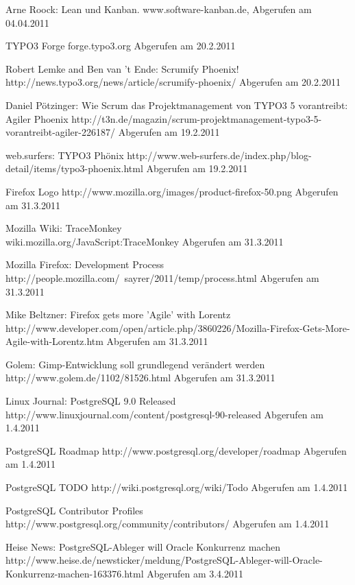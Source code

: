 \documentclass[german,english]{header}
\begin{document}
\begin{thebibliography}{5}
Arne Roock: 
Lean und Kanban.
www.software-kanban.de, Abgerufen am 04.04.2011

TYPO3 Forge
forge.typo3.org Abgerufen am 20.2.2011

Robert Lemke and Ben van 't Ende:
Scrumify Phoenix!
http://news.typo3.org/news/article/scrumify-phoenix/ Abgerufen am 20.2.2011

Daniel Pötzinger:
Wie Scrum das Projektmanagement von TYPO3 5 vorantreibt: Agiler Phoenix
http://t3n.de/magazin/scrum-projektmanagement-typo3-5-vorantreibt-agiler-226187/ Abgerufen am 19.2.2011

web.surfers:
TYPO3 Phönix
http://www.web-surfers.de/index.php/blog-detail/items/typo3-phoenix.html Abgerufen am 19.2.2011

Firefox Logo
http://www.mozilla.org/images/product-firefox-50.png Abgerufen am 31.3.2011


Mozilla Wiki:
TraceMonkey
\\wiki.mozilla.org/JavaScript:TraceMonkey Abgerufen am 31.3.2011

Mozilla Firefox: Development Process
http://people.mozilla.com/~sayrer/2011/temp/process.html Abgerufen am 31.3.2011

Mike Beltzner:
Firefox gets more 'Agile' with Lorentz
\\http://www.developer.com/open/article.php/3860226/Mozilla-Firefox-Gets-More-Agile-with-Lorentz.htm Abgerufen am 31.3.2011

Golem: Gimp-Entwicklung soll grundlegend verändert werden
http://www.golem.de/1102/81526.html Abgerufen am 31.3.2011

Linux Journal:
PostgreSQL 9.0 Released
http://www.linuxjournal.com/content/postgresql-90-released Abgerufen am 1.4.2011

PostgreSQL Roadmap
http://www.postgresql.org/developer/roadmap Abgerufen am 1.4.2011

PostgreSQL TODO
http://wiki.postgresql.org/wiki/Todo Abgerufen am 1.4.2011

PostgreSQL Contributor Profiles
http://www.postgresql.org/community/contributors/ Abgerufen am 1.4.2011

Heise News:
PostgreSQL-Ableger will Oracle Konkurrenz machen
http://www.heise.de/newsticker/meldung/PostgreSQL-Ableger-will-Oracle-Konkurrenz-machen-163376.html Abgerufen am 3.4.2011


\end{thebibliography}
\end{document}
